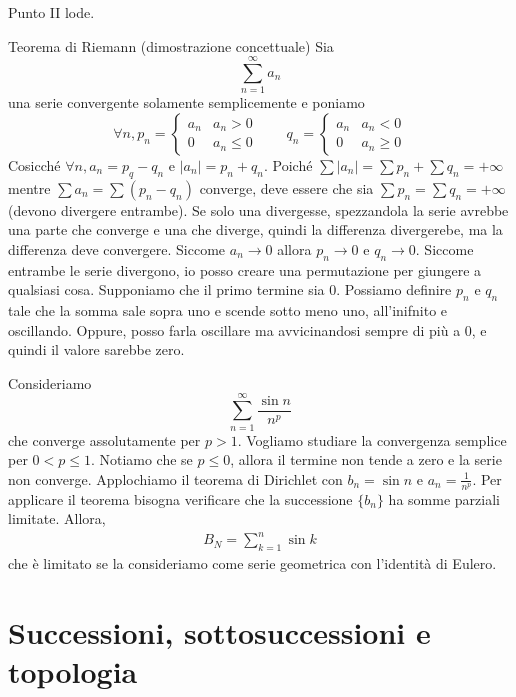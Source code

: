 \documentclass[a4paper]{article}
\begin{document}
Punto II lode.

\begin{snippetproof}{Teorema di Riemann (dimostrazione concettuale)}
    Sia
    \[
        \sum_{n=1}^\infty a_n
    \]
    una serie convergente solamente semplicemente e poniamo
    \[
        \forall n, p_n = \begin{cases}
            a_n & a_n > 0 \\
            0 & a_n \leq 0
        \end{cases}
        \qquad
        q_n = \begin{cases}
            a_n & a_n < 0 \\
            0 & a_n \geq 0
        \end{cases}
    \]
    Cosicché \(\forall n, a_n = p_q - q_n\) e \(|a_n| = p_n + q_n\).
    Poiché \(\sum |a_n| = \sum p_n + \sum q_n = +\infty\) mentre \(\sum a_n = \sum (p_n - q_n)\) converge,
    deve essere che sia \(\sum p_n = \sum q_n = +\infty\) (devono divergere entrambe).
    Se solo una divergesse, spezzandola la serie avrebbe una parte che converge e una che diverge, quindi la differenza divergerebe,
    ma la differenza deve convergere.
    Siccome \(a_n \to 0\) allora \(p_n \to 0\) e \(q_n \to 0\).
    Siccome entrambe le serie divergono, io posso creare una permutazione per giungere a qualsiasi cosa.
    Supponiamo che il primo termine sia \(0\). Possiamo definire \(p_n\) e \(q_n\)
    tale che la somma sale sopra uno e scende sotto meno uno, all'inifnito e oscillando.
    Oppure, posso farla oscillare ma avvicinandosi sempre di più a \(0\), e quindi il valore sarebbe zero.
\end{snippetproof}

Consideriamo
\[
    \sum_{n=1}^\infty \frac{\sin n}{n^p}
\]
che converge assolutamente per \(p>1\).
Vogliamo studiare la convergenza semplice per \(0 < p \leq 1\).
Notiamo che se \(p \leq 0\), allora il termine non tende a zero e la serie non converge.
Applochiamo il teorema di Dirichlet con \(b_n = \sin n\) e \(a_n = \frac{1}{n^p}\).
Per applicare il teorema bisogna verificare che la successione \(\{b_n\}\) ha somme parziali limitate.
Allora,
\begin{align*}
    B_N = \sum_{k=1}^n \sin k
\end{align*}
che è limitato se la consideriamo come serie geometrica con l'identità di Eulero.

\pagebreak

\section{Successioni, sottosuccessioni e topologia}
\end{document}
